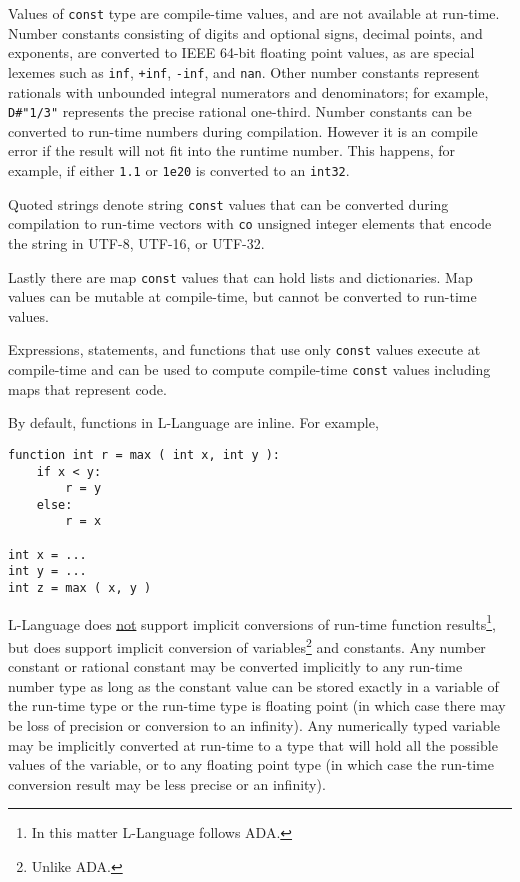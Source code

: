\documentclass[12pt]{article}
\newenvironment{indpar}[1][0.3in]%
	{\begin{list}{}%
		     {\setlength{\itemsep}{0in}%
		      \setlength{\topsep}{0in}%
		      \setlength{\parsep}{1ex}%
		      \setlength{\labelwidth}{#1}%
		      \setlength{\leftmargin}{#1}%
		      \addtolength{\leftmargin}{\labelsep}}%
	 \item}%
	{\end{list}}
\begin{document}
Values of {\tt const} type are compile-time values, and are
not available at run-time.  Number constants consisting of
digits and optional signs, decimal points, and exponents,
are converted to IEEE 64-bit floating point values, as are
special lexemes such as {\tt inf}, {\tt +inf}, {\tt -inf}, and
{\tt nan}.  Other number constants represent
rationals with unbounded integral numerators
and denominators; for example,
{\tt D\#"1/3"} represents the precise rational one-third.
Number constants
can be converted to run-time numbers during compilation.
However it is an compile error
if the result will not fit into the runtime number.
This happens, for example, if either {\tt 1.1} or {\tt 1e20}
is converted to an {\tt int32}.

Quoted strings denote string {\tt const} values that can be
converted during compilation to run-time vectors
with {\tt co} unsigned integer elements that encode the
string in UTF-8, UTF-16, or UTF-32.

Lastly there are map {\tt const} values that can hold lists
and dictionaries.  Map values can be mutable at compile-time,
but cannot be converted to run-time values.

Expressions, statements, and functions that use only {\tt const} values
execute at compile-time and can be used to compute compile-time
{\tt const} values including maps that represent code.

By default, functions in L-Language are inline.  For example,

\begin{indpar}\begin{verbatim}
function int r = max ( int x, int y ):
    if x < y:
        r = y
    else:
        r = x

int x = ...
int y = ...
int z = max ( x, y )
\end{verbatim}\end{indpar}

L-Language does \underline{not} support implicit conversions of
run-time function results\footnote{In this matter L-Language follows ADA.},
but does support implicit conversion of variables\footnote{Unlike ADA.}
and constants.  Any number constant or rational constant may be
converted implicitly to any run-time number type as long as
the constant value can be stored exactly in a variable
of the run-time type or the run-time type is floating point
(in which case there may be loss of precision or conversion to
an infinity).
Any numerically typed variable may be implicitly converted
at run-time to a type that will hold all the possible values of
the variable, or to any floating point type
(in which case the run-time conversion result
may be less precise or an infinity).
\end{document}

